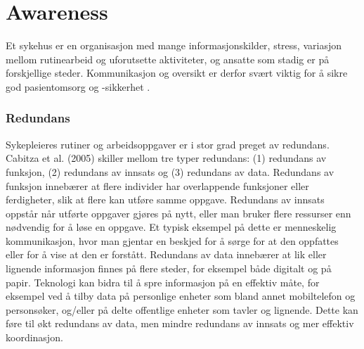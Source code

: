 \section{Awareness}
\label{chp: awareness}

Et sykehus er en organisasjon med mange informasjonskilder, stress, variasjon mellom rutinearbeid og uforutsette aktiviteter, og ansatte som stadig er på forskjellige steder. Kommunikasjon og oversikt er derfor svært viktig for å sikre god pasientomsorg og -sikkerhet \cite{Klemets12}.

\subsubsection{Redundans}
Sykepleieres rutiner og arbeidsoppgaver er i stor grad preget av redundans. Cabitza et al. (2005) skiller mellom tre typer redundans: (1) redundans av funksjon, (2) redundans av innsats og (3) redundans av data. Redundans av funksjon innebærer at flere individer har overlappende funksjoner eller ferdigheter, slik at flere kan utføre samme oppgave. Redundans av innsats oppstår når utførte oppgaver gjøres på nytt, eller man bruker flere ressurser enn nødvendig for å løse en oppgave. Et typisk eksempel på dette er menneskelig kommunikasjon, hvor man gjentar en beskjed for å sørge for at den oppfattes eller for å vise at den er forstått. Redundans av data innebærer at lik eller lignende informasjon finnes på flere steder, for eksempel både digitalt og på papir. Teknologi kan bidra til å spre informasjon på en effektiv måte, for eksempel ved å tilby data på personlige enheter som bland annet mobiltelefon og personsøker, og/eller på delte offentlige enheter som tavler og lignende. Dette kan føre til økt redundans av data, men mindre redundans av innsats og mer effektiv koordinasjon.

